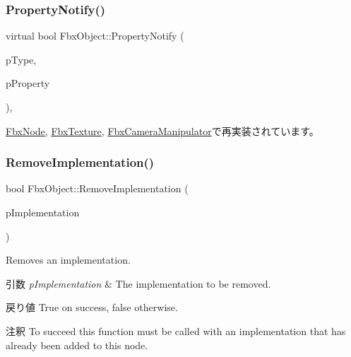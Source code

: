 \subsubsection{\texorpdfstring{Property\+Notify()}{PropertyNotify()}}
{\footnotesize\ttfamily virtual bool Fbx\+Object\+::\+Property\+Notify (\begin{DoxyParamCaption}\item[{\hyperlink{class_fbx_object_a528f1b2c2b7abbd64c525ba3a9a496b8}{E\+Property\+Notify\+Type}}]{p\+Type,  }\item[{\hyperlink{class_fbx_property}{Fbx\+Property} \&}]{p\+Property }\end{DoxyParamCaption})\hspace{0.3cm}{\ttfamily [protected]}, {\ttfamily [virtual]}}



\hyperlink{class_fbx_node_ac0edd8ef92070544e170bd0a38ed1efc}{Fbx\+Node}, \hyperlink{class_fbx_texture_af45140c7eecc9b2e133d7ee8a63fd5f5}{Fbx\+Texture}, \hyperlink{class_fbx_camera_manipulator_aa0b1cdb3a150798e03587a3adeadd87a}{Fbx\+Camera\+Manipulator}で再実装されています。

\mbox{\label{class_fbx_object_af5372f14b186dbd1e69688e899c46081}} 
\subsubsection{\texorpdfstring{Remove\+Implementation()}{RemoveImplementation()}}
{\footnotesize\ttfamily bool Fbx\+Object\+::\+Remove\+Implementation (\begin{DoxyParamCaption}\item[{\hyperlink{class_fbx_implementation}{Fbx\+Implementation} $\ast$}]{p\+Implementation }\end{DoxyParamCaption})}

Removes an implementation. 
\begin{DoxyParams}{引数}
{\em p\+Implementation} & The implementation to be removed. \\
\hline
\end{DoxyParams}
\begin{DoxyReturn}{戻り値}
{\ttfamily True} on success, {\ttfamily false} otherwise. 
\end{DoxyReturn}
\begin{DoxyRemark}{注釈}
To succeed this function must be called with an implementation that has already been added to this node. 
\end{DoxyRemark}
\mbox{\label{class_fbx_object_aa4a97de3c9d2d74d7b58f579ad3ad453}} 
